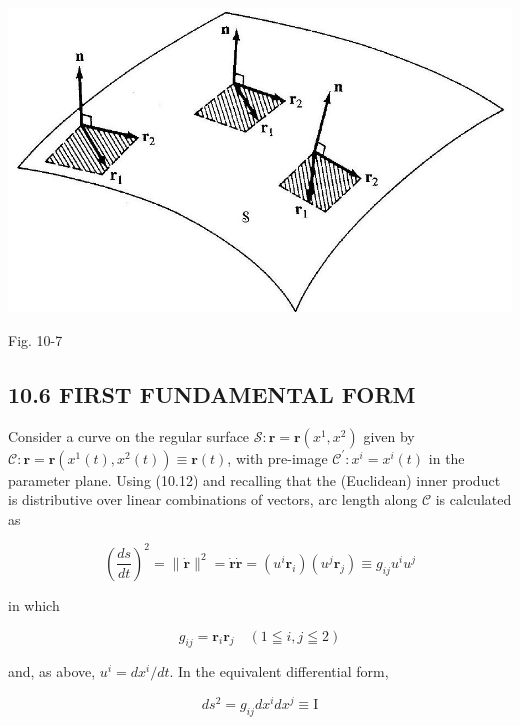 \documentclass[10pt]{article}
\begin{document}
\begin{center}
\includegraphics[max width=\textwidth]{2024_04_03_41f90be4f896e21f0dc9g-142}
\end{center}

Fig. 10-7

\subsection*{10.6 FIRST FUNDAMENTAL FORM}
Consider a curve on the regular surface $\mathscr{S}: \mathbf{r}=\mathbf{r}\left(x^{1}, x^{2}\right)$ given by $\mathscr{C}: \mathbf{r}=\mathbf{r}\left(x^{1}(t), x^{2}(t)\right) \equiv \mathbf{r}(t)$, with pre-image $\mathscr{C}^{\prime}: x^{i}=x^{i}(t)$ in the parameter plane. Using (10.12) and recalling that the (Euclidean) inner product is distributive over linear combinations of vectors, arc length along $\mathscr{C}$ is calculated as


\begin{equation*}
\left(\frac{d s}{d t}\right)^{2}=\|\dot{\mathbf{r}}\|^{2}=\dot{\mathbf{r}} \dot{\mathbf{r}}=\left(u^{i} \mathbf{r}_{i}\right)\left(u^{j} \mathbf{r}_{j}\right) \equiv g_{i j} u^{i} u^{j} \tag{10.14a}
\end{equation*}


in which


\begin{equation*}
g_{i j}=\mathbf{r}_{i} \mathbf{r}_{j} \quad(1 \leqq i, j \leqq 2) \tag{10.15}
\end{equation*}


and, as above, $u^{i}=d x^{i} / d t$. In the equivalent differential form,


\begin{equation*}
d s^{2}=g_{i j} d x^{i} d x^{j} \equiv \mathrm{I} \tag{10.14b}
\end{equation*}
\end{document}
